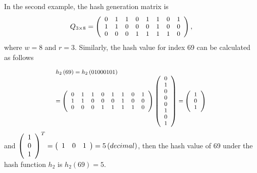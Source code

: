 \documentclass[10pt,journal,compsoc]{IEEEtran}
\begin{document}
In the second example, the hash generation matrix is
\begin{equation}
\footnotesize
{Q_{3 \times 8}} = \left( {\begin{array}{*{20}{c}}
   0 & 1 & 1 & 0 & 1 & 1 & 0 & 1  \\
   1 & 1 & 0 & 0 & 0 & 1 & 0 & 0  \\
   0 & 0 & 0 & 1 & 1 & 1 & 1 & 0  \\
\end{array}} \right),
\label{eq:h2matrix}
\end{equation}
where $w=8$ and $r=3$. Similarly, the hash value for index 69 can be calculated as follows

\begin{equation}
\scriptsize
\begin{array}{l}
 {h_2}\left( {69} \right) = h_2\left( {{\rm{01000101}}} \right) \\
  = \left( {\begin{array}{*{20}{c}}
   0 & 1 & 1 & 0 & 1 & 1 & 0 & 1  \\
   1 & 1 & 0 & 0 & 0 & 1 & 0 & 0  \\
   0 & 0 & 0 & 1 & 1 & 1 & 1 & 0  \\
\end{array}} \right)\left( {\begin{array}{*{20}{c}}
   0  \\
   1  \\
   0  \\
   0  \\
   0  \\
   1  \\
   0  \\
   1  \\
\end{array}} \right) = \left( {\begin{array}{*{20}{c}}
   1  \\
   0  \\
   1  \\
\end{array}} \right) \\
 \end{array}
\label{eq:h3example2}
\end{equation}
\noindent and $\small {\left( {\begin{array}{*{20}{c}}
   1  \\
   0 \\
   1  \\
\end{array}} \right)^T} = \left( {\begin{array}{*{20}{c}}
   1 & 0 & 1  \\
\end{array}} \right) = 5\left( decimal \right)$, then the hash value of 69 under the hash function $h_2$ is $h_2(69)=5$.
\end{document}
